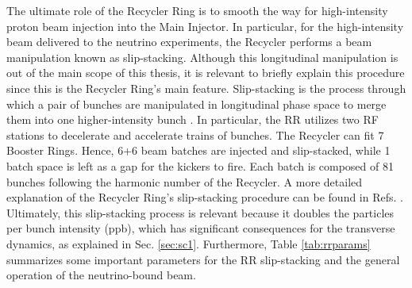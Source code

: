 The ultimate role of the Recycler Ring is to smooth the way for high-intensity proton beam injection into the Main Injector. In particular, for the high-intensity beam delivered to the neutrino experiments, the Recycler performs a beam manipulation known as slip-stacking. Although this longitudinal manipulation is out of the main scope of this thesis, it is relevant to briefly explain this procedure since this is the Recycler Ring's main feature. Slip-stacking is the process through which a pair of bunches are manipulated in longitudinal phase space to merge them into one higher-intensity bunch \cite{fermi_rookie}. In particular, the RR utilizes two RF stations to decelerate and accelerate trains of bunches. The Recycler can fit 7 Booster Rings. Hence, 6+6 beam batches are injected and slip-stacked, while 1 batch space is left as a gap for the kickers to fire. Each batch is composed of 81 bunches following the harmonic number of the Recycler. A more detailed explanation of the Recycler Ring's slip-stacking procedure can be found in Refs. \cite{rr1,rr2,fermi_rookie}. Ultimately, this slip-stacking process is relevant because it doubles the particles per bunch intensity (ppb), which has significant consequences for the transverse dynamics, as explained in Sec. \ref{sec:sc1}. Furthermore, Table \ref{tab:rrparams} summarizes some important parameters for the RR slip-stacking and the general operation of the neutrino-bound beam.     

